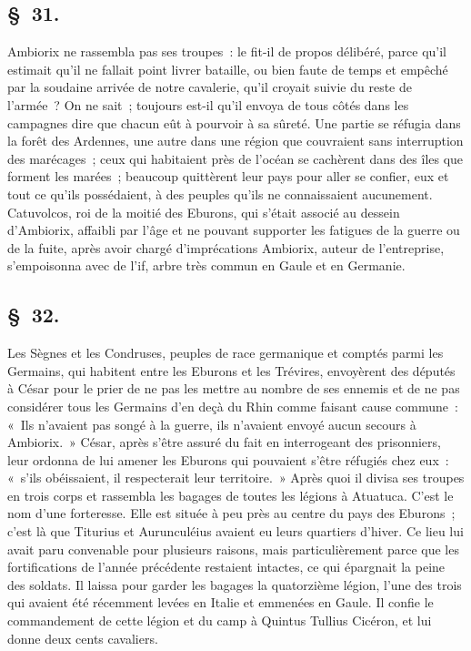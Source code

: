 \documentclass[french,twoside]{book} %
\begin{document}
\subsection[{§ 31.}]{ \textsc{§ 31.} }
\noindent Ambiorix ne rassembla pas ses troupes : le fit-il de propos délibéré, parce qu’il estimait qu’il ne fallait point livrer bataille, ou bien faute de temps et empêché par la soudaine arrivée de notre cavalerie, qu’il croyait suivie du reste de l’armée ? On ne sait ; toujours est-il qu’il envoya de tous côtés dans les campagnes dire que chacun eût à pourvoir à sa sûreté. Une partie se réfugia dans la forêt des Ardennes, une autre dans une région que couvraient sans interruption des marécages ; ceux qui habitaient près de l’océan se cachèrent dans des îles que forment les marées ; beaucoup quittèrent leur pays pour aller se confier, eux et tout ce qu’ils possédaient, à des peuples qu’ils ne connaissaient aucunement. Catuvolcos, roi de la moitié des Eburons, qui s’était associé au dessein d’Ambiorix, affaibli par l’âge et ne pouvant supporter les fatigues de la guerre ou de la fuite, après avoir chargé d’imprécations Ambiorix, auteur de l’entreprise, s’empoisonna avec de l’if, arbre très commun en Gaule et en Germanie.
\subsection[{§ 32.}]{ \textsc{§ 32.} }
\noindent Les Sègnes et les Condruses, peuples de race germanique et comptés parmi les Germains, qui habitent entre les Eburons et les Trévires, envoyèrent des députés à César pour le prier de ne pas les mettre au nombre de ses ennemis et de ne pas considérer tous les Germains d’en deçà du Rhin comme faisant cause commune : « Ils n’avaient pas songé à la guerre, ils n’avaient envoyé aucun secours à Ambiorix. » César, après s’être assuré du fait en interrogeant des prisonniers, leur ordonna de lui amener les Eburons qui pouvaient s’être réfugiés chez eux : « s’ils obéissaient, il respecterait leur territoire. » Après quoi il divisa ses troupes en trois corps et rassembla les bagages de toutes les légions à Atuatuca. C'est le nom d’une forteresse. Elle est située à peu près au centre du pays des Eburons ; c’est là que Titurius et Aurunculéius avaient eu leurs quartiers d’hiver. Ce lieu lui avait paru convenable pour plusieurs raisons, mais particulièrement parce que les fortifications de l’année précédente restaient intactes, ce qui épargnait la peine des soldats. Il laissa pour garder les bagages la quatorzième légion, l’une des trois qui avaient été récemment levées en Italie et emmenées en Gaule. Il confie le commandement de cette légion et du camp à Quintus Tullius Cicéron, et lui donne deux cents cavaliers.
\end{document}

